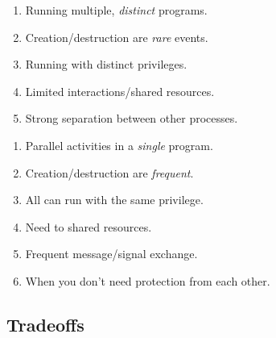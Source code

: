 \documentclass{report}
\begin{document}
\begin{tcbraster}[raster columns=2, raster equal height, raster force size=false]
  \begin{tcolorbox}[colback=teal!5!white,colframe=black!75!teal,title=Processes]
    \begin{enumerate}[label=\textit{(\roman*)}]
    \item Running multiple, \textit{distinct} programs.
    \item Creation/destruction are \textit{rare} events.
    \item Running with distinct privileges.
    \item Limited interactions/shared resources.
    \item Strong separation between other processes.
    \end{enumerate}
  \end{tcolorbox}
  \begin{tcolorbox}[colback=yellow!5!white,colframe=black!75!yellow,title=Threads]
    \begin{enumerate}[label=\textit{(\roman*)}]
    \item Parallel activities in a \textit{single} program.
    \item Creation/destruction are \textit{frequent}.
    \item All can run with the same privilege.
    \item Need to shared resources.
    \item Frequent message/signal exchange.
    \item When you don't need protection from each other.
    \end{enumerate}
  \end{tcolorbox}
\end{tcbraster}


\subsection{Tradeoffs}
\end{document}
